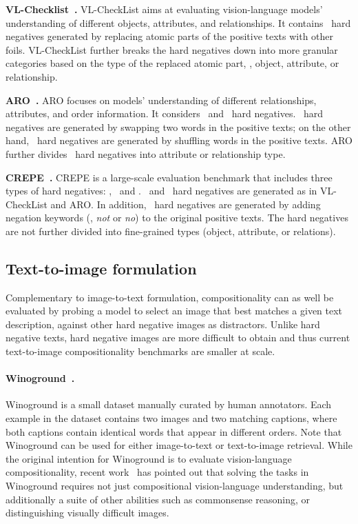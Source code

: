 \textbf{VL-Checklist~\cite{zhao2022vl}.} VL-CheckList aims at evaluating vision-language models' understanding of different objects, attributes, and relationships. It contains \replace\ hard negatives generated by replacing atomic parts of the positive texts with other foils.
VL-CheckList further breaks the hard negatives down into more granular categories based on the type of the replaced atomic part, \ie, object, attribute, or relationship.


\textbf{ARO~\cite{yuksekgonul2023when}.} ARO focuses on models' understanding of different relationships, attributes, and order information. It considers \swap\ and \shuffle\ hard negatives. \swap\ hard negatives are generated by swapping two words in the positive texts; on the other hand, \shuffle\ hard negatives are generated by shuffling words in the positive texts. ARO further divides \swap\ hard negatives into attribute or relationship type.


\textbf{CREPE~\cite{ma2022crepe}.} CREPE is a large-scale evaluation benchmark that includes three types of hard negatives: \replace, \swap\ and \negate. \replace\ and \swap\ hard negatives are generated as in VL-CheckList and ARO. In addition, \negate\ hard negatives are generated by adding negation keywords (\ie, \textit{not} or \textit{no}) to the original positive texts. The hard negatives are not further divided into fine-grained types (object, attribute, or relations).



\subsection{Text-to-image formulation}
Complementary to image-to-text formulation, compositionality can as well be evaluated by probing a model to select an image that best matches a given text description, against other hard negative images as distractors. Unlike hard negative texts, hard negative images are more difficult to obtain and thus current text-to-image compositionality benchmarks are smaller at scale.

\paragraph{Winoground~\cite{thrush2022winoground}.} Winoground is a small dataset manually curated by human annotators. Each example in the dataset contains two images and two matching captions, where both captions contain identical words that appear in different orders. Note that Winoground can be used for either image-to-text or text-to-image retrieval. While the original intention for Winoground is to evaluate vision-language compositionality, recent work~\cite{diwan2022winoground} has pointed out that solving the tasks in Winoground requires not just compositional vision-language understanding, but additionally a suite of other abilities such as commonsense reasoning, or distinguishing visually difficult images.

